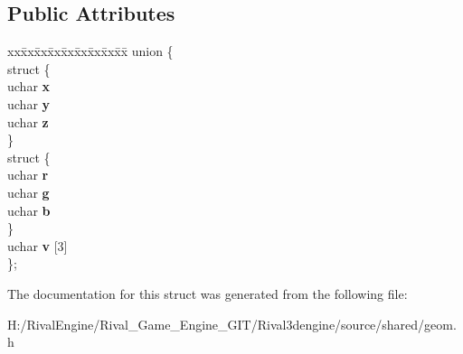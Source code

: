 \subsection*{Public Attributes}
\begin{DoxyCompactItemize}
\item 
\mbox{\label{structbvec_aff91b9b8b9a0729cea2adf3dc6decb51}} 
\begin{tabbing}
xx\=xx\=xx\=xx\=xx\=xx\=xx\=xx\=xx\=\kill
union \{\\
\mbox{\label{unionbvec_1_1_0D201_a3ea6ed4cba531d45fe5cc72ca902db09}} 
\>struct \{\\
\>\>uchar {\bfseries x}\\
\>\>uchar {\bfseries y}\\
\>\>uchar {\bfseries z}\\
\>\} \\
\mbox{\label{unionbvec_1_1_0D201_a9db4c118e300f806dcf5e7b0812b2e09}} 
\>struct \{\\
\>\>uchar {\bfseries r}\\
\>\>uchar {\bfseries g}\\
\>\>uchar {\bfseries b}\\
\>\} \\
\>uchar {\bfseries v} \mbox{[}3\mbox{]}\\
\}; \\

\end{tabbing}\end{DoxyCompactItemize}


The documentation for this struct was generated from the following file\+:\begin{DoxyCompactItemize}
\item 
H\+:/\+Rival\+Engine/\+Rival\+\_\+\+Game\+\_\+\+Engine\+\_\+\+G\+I\+T/\+Rival3dengine/source/shared/geom.\+h\end{DoxyCompactItemize}
